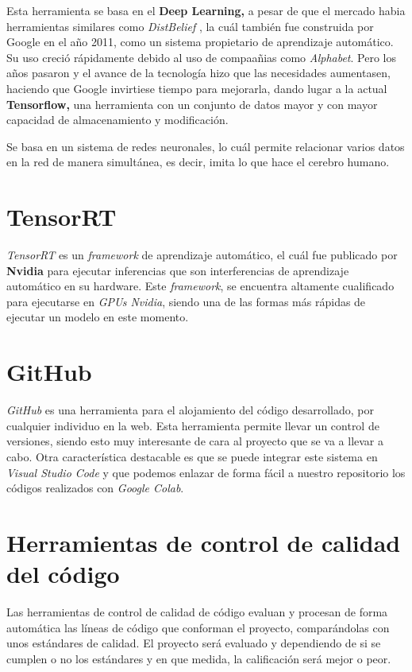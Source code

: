 Esta herramienta se basa en el \textbf{Deep Learning,} a pesar de que el mercado habia herramientas similares como \textit{DistBelief} \cite{distBelief}, la cuál también fue construida por Google en el año 2011, como un sistema propietario de aprendizaje automático. Su uso creció rápidamente debido al uso de compaañias como \textit{Alphabet}. Pero los años pasaron y el avance de la tecnología 
hizo que las necesidades aumentasen, haciendo que Google invirtiese tiempo para mejorarla, dando lugar a la actual \textbf{Tensorflow,} una herramienta con un conjunto de datos mayor y con mayor capacidad de almacenamiento y modificación.

Se basa en un sistema de redes neuronales, lo cuál permite relacionar varios datos en la red de manera simultánea, es decir, imita lo que hace el cerebro humano.

\section{TensorRT}
\textit{TensorRT} \cite{tensorrt} es un \textit{framework} de aprendizaje automático, el cuál fue publicado por \textbf{Nvidia} para ejecutar inferencias que son interferencias de aprendizaje automático en su hardware. Este \textit{framework}, se encuentra altamente cualificado para ejecutarse en \textit{GPUs Nvidia}, siendo una de las formas más rápidas de ejecutar un modelo en este momento.


\section{GitHub}
\textit{GitHub} \cite{github} es una herramienta para el alojamiento del código desarrollado, por cualquier individuo en la web. Esta herramienta permite llevar un control de versiones, siendo esto muy interesante de cara al proyecto que se va a llevar a cabo.
Otra característica destacable es que se puede integrar este sistema en \textit{Visual Studio Code} \cite{visualStudioCode} y que podemos enlazar de forma fácil a nuestro repositorio los códigos realizados con \textit{Google Colab}\cite{colab}.

\clearpage

\section{Herramientas de control de calidad del código}
Las herramientas de control de calidad de código evaluan y procesan de forma automática las líneas de código que conforman el proyecto, comparándolas con unos estándares de calidad. El proyecto será evaluado y dependiendo de si se cumplen o no los estándares y en que medida, la calificación será mejor o peor.

